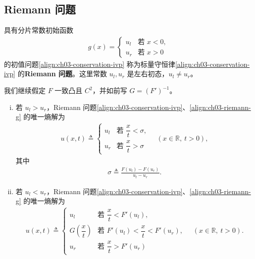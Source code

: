 \documentclass[../../main.tex]{subfiles}
\begin{document}
\subsection{Riemann 问题}\label{subsection:ch03-riemann}

具有分片常数初始函数
\begin{align}\label{align:ch03-riemann-g}
g(x)=
\begin{cases}
u_l & \text{若 }x<0,\\
u_r & \text{若 }x>0
\end{cases}
\end{align}
的初值问题\eqref{align:ch03-conservation-ivp} 称为标量守恒律\eqref{align:ch03-conservation-ivp} 的\textbf{Riemann 问题}。这里常数 $u_l,u_r$ 是左右初态，$u_l\neq u_r$。

我们继续假定 $F$ 一致凸且 $C^2$，并如前写 $G=(F')^{-1}$。

\begin{theorem}\label{theorem:ch03-riemann}
\begin{enumerate}[(i)]
\item 若 $u_l>u_r$，Riemann 问题\eqref{align:ch03-conservation-ivp}、\eqref{align:ch03-riemann-g} 的唯一熵解为
\begin{align}\label{align:ch03-riemann-shock}
u(x,t)\triangleq
\begin{cases}
u_l & \text{若 }\dfrac{x}{t}<\sigma,\\
u_r & \text{若 }\dfrac{x}{t}>\sigma
\end{cases}
\quad(x\in\mathbb{R},\ t>0),
\end{align}
其中
\begin{align}\label{align:ch03-sigma-riemann}
\sigma\triangleq\frac{F(u_l)-F(u_r)}{u_l-u_r}.
\end{align}
\item 若 $u_l<u_r$，Riemann 问题\eqref{align:ch03-conservation-ivp}、\eqref{align:ch03-riemann-g} 的唯一熵解为
\begin{align}\label{align:ch03-riemann-rarefaction}
u(x,t)\triangleq
\begin{cases}
u_l & \text{若 }\dfrac{x}{t}<F'(u_l),\\
G\!\left(\dfrac{x}{t}\right) & \text{若 }F'(u_l)<\dfrac{x}{t}<F'(u_r),\\
u_r & \text{若 }\dfrac{x}{t}>F'(u_r)
\end{cases}
\quad(x\in\mathbb{R},\ t>0).
\end{align}
\end{enumerate}
\end{theorem}
\end{document}
